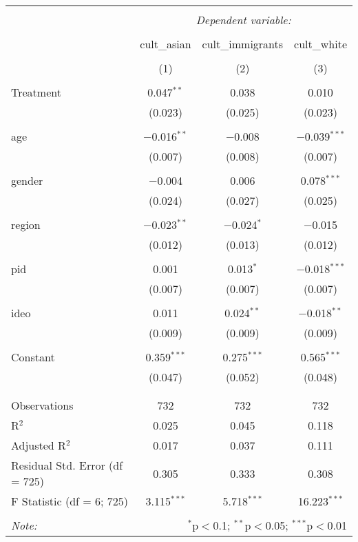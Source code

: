 
\begin{table}[!htbp] \centering 
  \caption{} 
  \label{} 
\begin{tabular}{@{\extracolsep{5pt}}lccc} 
\\[-1.8ex]\hline 
\hline \\[-1.8ex] 
 & \multicolumn{3}{c}{\textit{Dependent variable:}} \\ 
\cline{2-4} 
\\[-1.8ex] & cult\_asian & cult\_immigrants & cult\_white \\ 
\\[-1.8ex] & (1) & (2) & (3)\\ 
\hline \\[-1.8ex] 
 Treatment & 0.047$^{**}$ & 0.038 & 0.010 \\ 
  & (0.023) & (0.025) & (0.023) \\ 
  & & & \\ 
 age & $-$0.016$^{**}$ & $-$0.008 & $-$0.039$^{***}$ \\ 
  & (0.007) & (0.008) & (0.007) \\ 
  & & & \\ 
 gender & $-$0.004 & 0.006 & 0.078$^{***}$ \\ 
  & (0.024) & (0.027) & (0.025) \\ 
  & & & \\ 
 region & $-$0.023$^{**}$ & $-$0.024$^{*}$ & $-$0.015 \\ 
  & (0.012) & (0.013) & (0.012) \\ 
  & & & \\ 
 pid & 0.001 & 0.013$^{*}$ & $-$0.018$^{***}$ \\ 
  & (0.007) & (0.007) & (0.007) \\ 
  & & & \\ 
 ideo & 0.011 & 0.024$^{**}$ & $-$0.018$^{**}$ \\ 
  & (0.009) & (0.009) & (0.009) \\ 
  & & & \\ 
 Constant & 0.359$^{***}$ & 0.275$^{***}$ & 0.565$^{***}$ \\ 
  & (0.047) & (0.052) & (0.048) \\ 
  & & & \\ 
\hline \\[-1.8ex] 
Observations & 732 & 732 & 732 \\ 
R$^{2}$ & 0.025 & 0.045 & 0.118 \\ 
Adjusted R$^{2}$ & 0.017 & 0.037 & 0.111 \\ 
Residual Std. Error (df = 725) & 0.305 & 0.333 & 0.308 \\ 
F Statistic (df = 6; 725) & 3.115$^{***}$ & 5.718$^{***}$ & 16.223$^{***}$ \\ 
\hline 
\hline \\[-1.8ex] 
\textit{Note:}  & \multicolumn{3}{r}{$^{*}$p$<$0.1; $^{**}$p$<$0.05; $^{***}$p$<$0.01} \\ 
\end{tabular} 
\end{table} 
